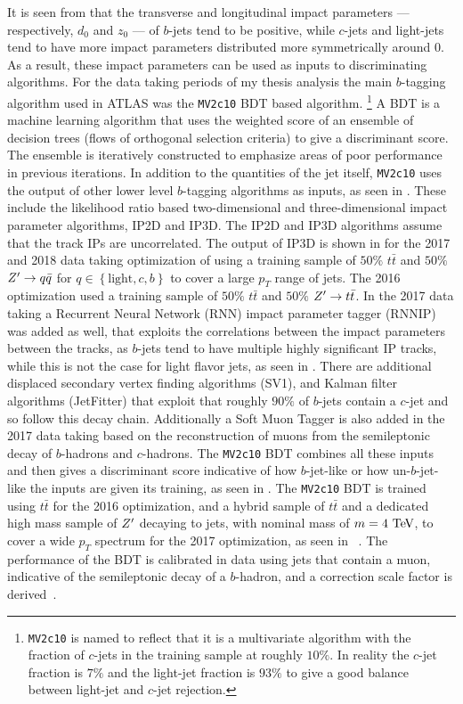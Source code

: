 It is seen from  that the transverse and longitudinal impact parameters --- respectively, $d_{0}$ and $z_{0}$ --- of $b$-jets tend to be positive, while $c$-jets and light-jets tend to have more impact parameters distributed more symmetrically around $0$.
As a result, these impact parameters can be used as inputs to discriminating algorithms.
For the data taking periods of my thesis analysis the main $b$-tagging algorithm used in ATLAS was the \texttt{MV2c10} \gls{BDT} based algorithm.%
\footnote{\texttt{MV2c10} is named to reflect that it is a multivariate algorithm with the fraction of $c$-jets in the training sample at roughly $10\%$.
 In reality the $c$-jet fraction is $7\%$ and the light-jet fraction is $93\%$ to give a good balance between light-jet and $c$-jet rejection.}
A \gls{BDT} is a machine learning algorithm that uses the weighted score of an ensemble of decision trees (flows of orthogonal selection criteria) to give a discriminant score.
The ensemble is iteratively constructed to emphasize areas of poor performance in previous iterations.
In addition to the quantities of the jet itself, \texttt{MV2c10} uses the output of other lower level $b$-tagging algorithms as inputs, as seen in .
These include the likelihood ratio based two-dimensional and three-dimensional impact parameter algorithms, IP2D and IP3D.
The IP2D and IP3D algorithms assume that the track IPs are uncorrelated.
The output of IP3D is shown in  for the 2017 and 2018 data taking optimization of using a training sample of $50\%$ $t\bar{t}$ and $50\%$ $Z^{\prime} \to q\bar{q}$ for $q\in\left\{\mathrm{light}, c, b\right\}$ to cover a large $p_{T}$ range of jets.
The 2016 optimization used a training sample of $50\%$ $t\bar{t}$ and $50\%$ $Z^{\prime} \to t\bar{t}$.
In the 2017 data taking a Recurrent Neural Network (RNN) impact parameter tagger (RNNIP)~\cite{ATL-PHYS-PUB-2017-003} was added as well, that exploits the correlations between the impact parameters between the tracks, as $b$-jets tend to have multiple highly significant IP tracks, while this is not the case for light flavor jets, as seen in .
There are additional displaced secondary vertex finding algorithms (SV1), and Kalman filter algorithms (JetFitter) that exploit that roughly $90\%$ of $b$-jets contain a $c$-jet and so follow this decay chain.
Additionally a Soft Muon Tagger is also added in the 2017 data taking based on
the reconstruction of muons from the semileptonic decay of $b$-hadrons and $c$-hadrons.
The \texttt{MV2c10} BDT combines all these inputs and then gives a discriminant score indicative of how $b$-jet-like or how un-$b$-jet-like the inputs are given its training, as seen in .
The \texttt{MV2c10} BDT is trained using $t\bar{t}$ for the 2016 optimization, and a hybrid sample of $t\bar{t}$ and a dedicated high mass sample of $Z^{\prime}$ decaying to jets, with nominal mass of $m = 4~\text{Te\kern-0.1em V}$, to cover a wide $p_{T}$ spectrum for the 2017 optimization, as seen in ~\cite{ATL-PHYS-PUB-2017-013}.
The performance of the BDT is calibrated in data using jets that contain a muon, indicative of the semileptonic decay of a $b$-hadron, and a correction scale factor is derived~\cite{PERF-2016-05}.

